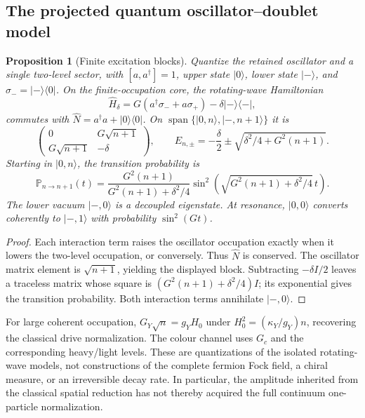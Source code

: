 \documentclass[11pt,a4paper,oneside]{book}
\theoremstyle{plain}
\newtheorem{proposition}[theorem]{Proposition}
\theoremstyle{definition}
\theoremstyle{remark}
\newcommand{\src}[2]{\cite{#1}}
\begin{document}
\subsection{The projected quantum oscillator--doublet model}
\begin{proposition}[Finite excitation blocks]
\label{prop:quantum-conversion}
Quantize the retained oscillator and a single two-level sector, with
$[a,a^\dagger]=1$, upper state $|0\rangle$, lower state $|-\rangle$,
and $\sigma_-=|-\rangle\langle0|$.  On the finite-occupation core, the rotating-wave Hamiltonian
\begin{equation}
 \widehat H_\delta
 =G(a^\dagger\sigma_-+a\sigma_+)
                        -\delta|-\rangle\langle-|,
 \label{eq:projected-jc}
\end{equation}
commutes with
$\widehat N=a^\dagger a+|0\rangle\langle0|$.
On $\operatorname{span}\{|0,n\rangle,|-,n+1\rangle\}$ it is
\begin{equation}
 \begin{pmatrix}0&G\sqrt{n+1}\\G\sqrt{n+1}&-\delta\end{pmatrix},
 \qquad
 E_{n,\pm}=-\frac\delta2
       \pm\sqrt{\delta^2/4+G^2(n+1)}.
 \label{eq:quantum-doublet-spectrum}
\end{equation}
Starting in $|0,n\rangle$, the transition probability is
\begin{equation}
 \mathbb P_{n\to n+1}(t)
 =\frac{G^2(n+1)}{G^2(n+1)+\delta^2/4}
       \sin^2\!\left(\sqrt{G^2(n+1)+\delta^2/4}\,t\right).
 \label{eq:quantum-conversion-probability}
\end{equation}
The lower vacuum $|-,0\rangle$ is a decoupled eigenstate.  At resonance,
$|0,0\rangle$ converts coherently to $|-,1\rangle$ with probability
$\sin^2(Gt)$.
\end{proposition}
\begin{proof}
Each interaction term raises the oscillator occupation exactly when it
lowers the two-level occupation, or conversely.  Thus $\widehat N$ is
conserved.  The oscillator matrix element is $\sqrt{n+1}$, yielding the
displayed block.  Subtracting $-\delta I/2$ leaves a traceless matrix
whose square is $(G^2(n+1)+\delta^2/4)I$; its exponential gives the
transition probability.  Both interaction terms annihilate $|-,0\rangle$.
\end{proof}
\src{R20}{thm:v20v26-jc,thm:v20v27-jc}

For large coherent occupation, $G_Y\sqrt n=g_YH_0$ under
$H_0^2=(\kappa_Y/g_Y)n$, recovering the classical drive normalization.
The colour channel uses $G_c$ and the corresponding heavy/light levels.
These are quantizations of the isolated rotating-wave models, not
constructions of the complete fermion Fock field, a chiral measure, or
an irreversible decay rate.  In particular, the amplitude inherited
from the classical spatial reduction has not thereby acquired the full
continuum one-particle normalization.
\end{document}

